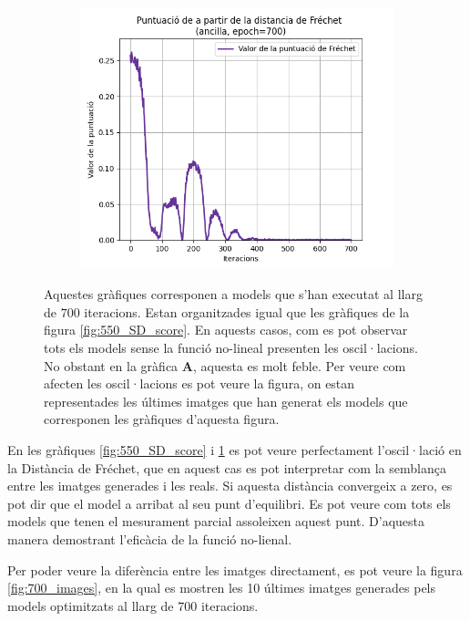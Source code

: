 \begin{figure}[H]
\begin{subfigure}[b]{.32\linewidth}
		\includegraphics[width=\linewidth]{figures/data/FD_score_A6.png}
		\caption{}
	\end{subfigure}
	\caption{Aquestes gràfiques corresponen a models que s'han executat al llarg de $700$ iteracions. Estan organitzades igual que les gràfiques de la figura \ref{fig:550_SD_score}. En aquests casos, com es pot observar tots els models sense la funció no-lineal presenten les oscil·lacions. No obstant en la gràfica \textbf{A}, aquesta es molt feble. Per veure com afecten les oscil·lacions es pot veure la figura, on estan representades les últimes imatges que han generat els models que corresponen les gràfiques d'aquesta figura.}
	\label{fig:700_SD_score}
\end{figure}

En les gràfiques \ref{fig:550_SD_score} i \ref{fig:700_SD_score} es pot veure perfectament l'oscil·lació en la Distància de Fréchet, que en aquest cas es pot interpretar com la semblança entre les imatges generades i les reals. Si aquesta distància convergeix a zero, es pot dir que el model a arribat al seu punt d'equilibri. Es pot veure com tots els models que tenen el mesurament parcial assoleixen aquest punt. D'aquesta manera demostrant l'eficàcia de la funció no-lienal.

Per poder veure la diferència entre les imatges directament, es pot veure la figura \ref{fig:700_images}, en la qual es mostren les 10 últimes imatges generades pels models optimitzats al llarg de 700 iteracions.

